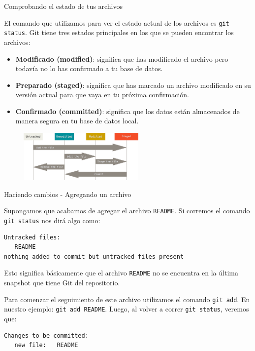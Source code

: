 \documentclass{beamer}
\begin{document}
\begin{frame}{Comprobando el estado de tus archivos}

    El comando que utilizamos para ver el estado actual de los archivos es \texttt{git status}.
    Git tiene tres estados principales en los que se pueden encontrar los archivos:

    \begin{itemize}
        \item \textbf{Modificado (modified)}: significa que has modificado el archivo pero todavía no lo has confirmado a tu base de datos.
        \item \textbf{Preparado (staged)}: significa que has marcado un archivo modificado en su versión actual para que vaya en tu próxima confirmación.
        \item \textbf{Confirmado (committed)}: significa que los datos están almacenados de manera segura en tu base de datos local.
    \end{itemize}

    \begin{figure}[ht]
        \begin{center}
            \includegraphics[height=1in]{images/files-lifecycle.png}
        \end{center}
    \end{figure}

\end{frame}

\begin{frame}[fragile]{Haciendo cambios - Agregando un archivo}

    Supongamos que acabamos de agregar el archivo \texttt{README}.
    Si corremos el comando \texttt{git status} nos dirá algo como:
    \begin{verbatim}
Untracked files:
   README
nothing added to commit but untracked files present
    \end{verbatim}
    Esto significa básicamente que el archivo \texttt{README} no se encuentra
    en la última snapshot que tiene Git del repositorio.

    Para comenzar el seguimiento de este archivo utilizamos el comando \texttt{git add}. En nuestro ejemplo: \texttt{git add README}.
    Luego, al volver a correr \texttt{git status}, veremos que:
    \begin{verbatim}
Changes to be committed:
   new file:   README
    \end{verbatim}

\end{frame}
\end{document}
